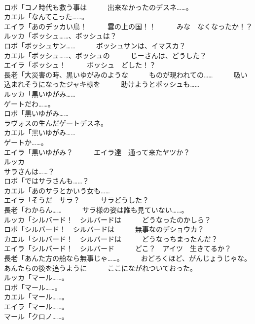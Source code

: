 \documentclass[8pt]{extreport}
\begin{document}
\begin{CJK}{UTF8}{min}
\\	ロボ「コノ時代も救う事は　　　出来なかったのデスネ……。	
\\	カエル「なんてこった……。	
\\	エイラ「あのデッカい鳥！　　　雲の上の国！！　　　みな　なくなったか！？	
\\	ルッカ「ボッシュ……、ボッシュは？	
\\	ロボ「ボッシュサン……　　　ボッシュサンは、イマスカ？	
\\	カエル「ボッシュ……、ボッシュの　　　じーさんは、どうした？	
\\	エイラ「ボッシュ！　　　ボッシュ　どした！？	
\\	長老「大災害の時、黒いゆがみのような　　　ものが現われての……　　　吸い込まれそうになったジャキ様を　　　助けようとボッシュも……	
\\	ルッカ「黒いゆがみ……	
\\	ゲートだわ……。	
\\	ロボ「黒いゆがみ……	
\\	ラヴォスの生んだゲートデスネ。	
\\	カエル「黒いゆがみ……	
\\	ゲートか……。	
\\	エイラ「黒いゆがみ？　　　エイラ達　通って来たヤツか？	
\\	ルッカ
\\	サラさんは……？	
\\	ロボ「ではサラさんも……？	
\\	カエル「あのサラとかいう女も……	
\\	エイラ「そうだ　サラ？　　　サラどうした？	
\\	長老「わからん……　　　サラ様の姿は誰も見ていない……。	
\\	ルッカ「シルバード！　シルバードは　　　どうなったのかしら？	
\\	ロボ「シルバード！　シルバードは　　　無事なのデショウカ？	
\\	カエル「シルバード！　シルバードは　　　どうなっちまったんだ？	
\\	エイラ「シルバード！　シルバード　　　どこ？　アイツ　生きてるか？	
\\	長老「あんた方の船なら無事じゃ……。　　　おどろくほど、がんじょうじゃな。　　　あんたらの後を追うように　　　ここにながれついておった。	
\\	ルッカ「マール……。	
\\	ロボ「マール……。	
\\	カエル「マール……。	
\\	エイラ「マール……。	
\\	マール「クロノ……。	

\end{CJK}
\end{document}

